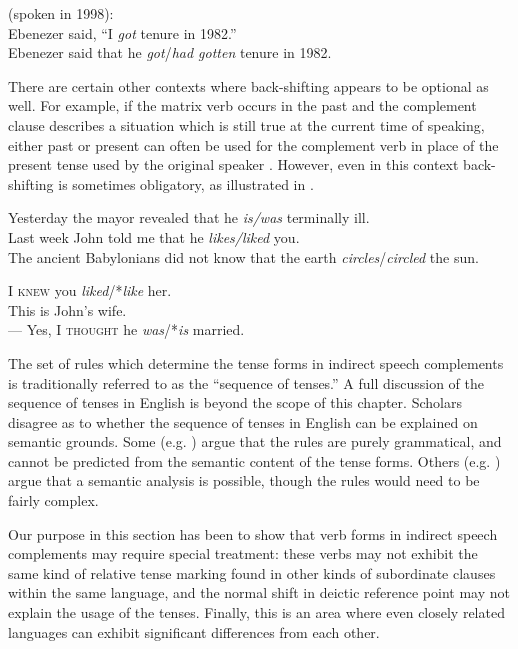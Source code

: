 \ea \label{ex:21.33}
(spoken in 1998):\\
 Ebenezer said, “I \textit{got} tenure in 1982.”\\
 Ebenezer said that he \textit{got}/\textit{had gotten} tenure in 1982.
                       \z
\z


There are certain other contexts where back-shifting appears to be optional as well. For example, if the matrix verb occurs in the past and the complement clause describes a situation which is still true at the current time of speaking, either past or present can often be used for the complement verb in place of the present tense used by the original speaker . However, even in this context back-shifting is sometimes obligatory, as illustrated in .


\ea \label{ex:21.34}
\ea  Yesterday the mayor revealed that he \textit{is/was} terminally ill.\\
\ex Last week John told me that he \textit{likes/liked} you.\\
\ex The ancient Babylonians did not know that the earth \textit{circles}/\textit{circled} the sun.
                       \z
\z

\ea \label{ex:21.35}
\ea  I \textsc{knew} you \textit{liked}/*\textit{like} her.\\
\ex This is John’s wife.\\
  — Yes, I \textsc{thought} he \textit{was}/*\textit{is} married.
                       \z
\z


The set of rules which determine the tense forms in indirect speech complements is traditionally referred to as the “sequence of tenses.” A full discussion of the sequence of tenses in English is beyond the scope of this chapter. Scholars disagree as to whether the sequence of tenses in English can be explained on semantic grounds. Some (e.g. \citealt{Comrie1985}) argue that the rules are purely grammatical, and cannot be predicted from the semantic content of the tense forms. Others (e.g. \citealt{Declerck1991}) argue that a semantic analysis is possible, though the rules would need to be fairly complex.



Our purpose in this section has been to show that verb forms in indirect speech complements may require special treatment: these verbs may not exhibit the same kind of relative tense marking found in other kinds of subordinate clauses within the same language, and the normal shift in deictic reference point may not explain the usage of the tenses. Finally, this is an area where even closely related languages can exhibit significant differences from each other.


